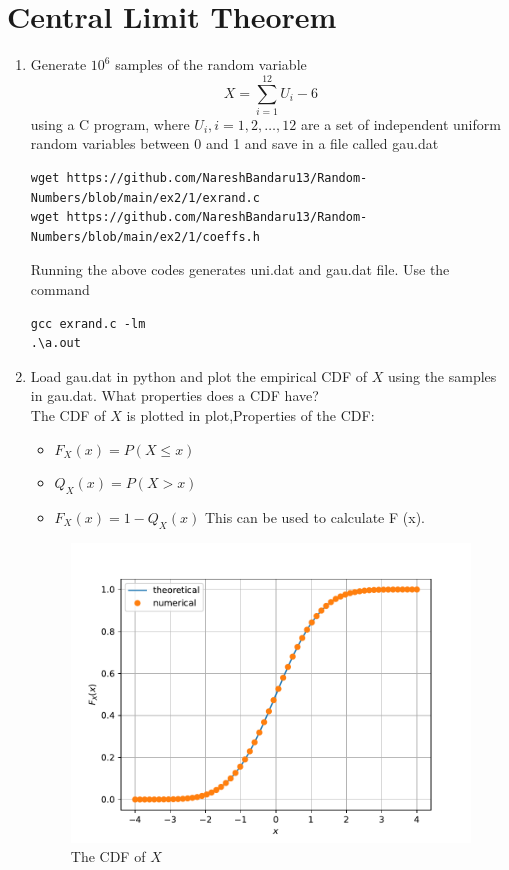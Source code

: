 \documentclass[journal,12pt,twocolumn]{IEEEtran}
\renewcommand\thesection{\arabic{section}}
\begin{document}
\section{Central Limit Theorem}
\begin{enumerate}[label=\thesection.\arabic*,ref=\thesection.\theenumi]

\item
Generate $10^6$ samples of the random variable
%
\begin{equation}
X = \sum_{i=1}^{12}U_i -6
\end{equation}
%
using a C program, where $U_i, i = 1,2,\dots, 12$ are  a set of independent uniform random variables between 0 and 1
and save in a file called gau.dat
\\
\solution
\begin{lstlisting}
wget https://github.com/NareshBandaru13/Random-Numbers/blob/main/ex2/1/exrand.c
wget https://github.com/NareshBandaru13/Random-Numbers/blob/main/ex2/1/coeffs.h
\end{lstlisting}
Running the above codes generates uni.dat and gau.dat file.
Use the command 
\begin{lstlisting}
gcc exrand.c -lm
.\a.out
\end{lstlisting}

\item
Load gau.dat in python and plot the empirical CDF of $X$ using the samples in gau.dat. What properties does a CDF have?
\\
\solution 
The CDF of $X$ is plotted in plot,Properties of the CDF:
\begin{itemize}
\item $F_X (x)=P(X \leq x) $
\item $Q_X (x) = P(X > x)$
\item  $F_X (x) = 1 - Q_X (x)$ This can be used to calculate F (x).
\end{itemize}

\begin{figure}[H]
\centering
\includegraphics[width=\columnwidth]{gau_cdf.pdf}
\caption{The CDF of $X$}
\label{fig:gau_cdf}
\end{figure}


\end{enumerate}
\end{document}
